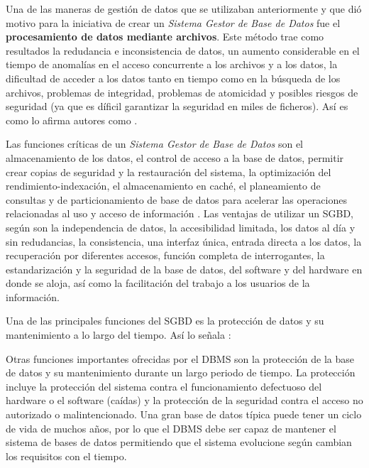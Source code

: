 \documentclass[12pt]{article}
\begin{document}
Una de las maneras de gestión de datos que se utilizaban anteriormente y que dió motivo para la iniciativa de crear un \textit{Sistema Gestor de Base de Datos} fue el \textbf{procesamiento de datos mediante archivos}. Este método trae como resultados la redudancia e inconsistencia de datos, un aumento considerable en el tiempo de anomalías en el acceso concurrente a los archivos y a los datos, la dificultad de acceder a los datos tanto en tiempo como en la búsqueda de los archivos, problemas de integridad, problemas de atomicidad y posibles riesgos de seguridad (ya que es díficil garantizar la seguridad en miles de ficheros). Así es como lo afirma autores como \textcite{Silberschatz2014}.
\newline

Las funciones críticas de un \textit{Sistema Gestor de Base de Datos} son el almacenamiento de los datos, el control de acceso a la base de datos, permitir crear copias de seguridad y la restauración del sistema, la optimización del rendimiento-indexación, el almacenamiento en caché, el planeamiento de consultas y de particionamiento de base de datos para acelerar las operaciones relacionadas al uso y acceso de información \parencite{microsoft}. Las ventajas de utilizar un SGBD, según \textcite{Ramirez2009} son la independencia de datos, la accesibilidad limitada, los datos al día y sin redudancias, la consistencia, una interfaz única, entrada directa a los datos, la recuperación por diferentes accesos, función completa de interrogantes, la estandarización y la seguridad de la base de datos, del software y del hardware en donde se aloja, así como la facilitación del trabajo a los usuarios de la información.
\newline

Una de las principales funciones del SGBD es la protección de datos y su mantenimiento a lo largo del tiempo. Así lo señala \textcite{Elmasri2007}:


\begin{displayquote}
	Otras funciones importantes ofrecidas por el DBMS son la protección de la base de datos y su mantenimiento durante un largo periodo de tiempo. La protección incluye la protección del sistema contra el funcionamiento defectuoso del hardware o el software (caídas) y la protección de la seguridad contra el acceso no autorizado o malintencionado. Una gran base de datos típica puede tener un ciclo de vida de muchos años, por lo que el DBMS debe ser capaz de mantener el sistema de bases de datos permitiendo que el sistema evolucione según cambian los requisitos con el tiempo.
\end{displayquote}
\end{document}
